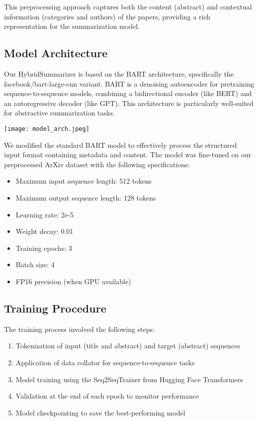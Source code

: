 \documentclass[conference]{IEEEtran}
\begin{document}
This preprocessing approach captures both the content (abstract) and contextual information (categories and authors) of the papers, providing a rich representation for the summarization model.

\subsection{Model Architecture}
Our HybridSummarizer is based on the BART architecture, specifically the facebook/bart-large-cnn variant. BART is a denoising autoencoder for pretraining sequence-to-sequence models, combining a bidirectional encoder (like BERT) and an autoregressive decoder (like GPT). This architecture is particularly well-suited for abstractive summarization tasks.

\begin{center}
    \texttt{[image: model\_arch.jpeg]}
    \label{fig:Hybrid Summarizer Model Architecture}
\end{center}
We modified the standard BART model to effectively process the structured input format containing metadata and content. The model was fine-tuned on our preprocessed ArXiv dataset with the following specifications:

\begin{itemize}
\item Maximum input sequence length: 512 tokens
\item Maximum output sequence length: 128 tokens
\item Learning rate: 2e-5
\item Weight decay: 0.01
\item Training epochs: 3
\item Batch size: 4
\item FP16 precision (when GPU available)
\end{itemize}

\subsection{Training Procedure}
The training process involved the following steps:

\begin{enumerate}
\item Tokenization of input (title and abstract) and target (abstract) sequences
\item Application of data collator for sequence-to-sequence tasks
\item Model training using the Seq2SeqTrainer from Hugging Face Transformers
\item Validation at the end of each epoch to monitor performance
\item Model checkpointing to save the best-performing model
\end{enumerate}
\end{document}
